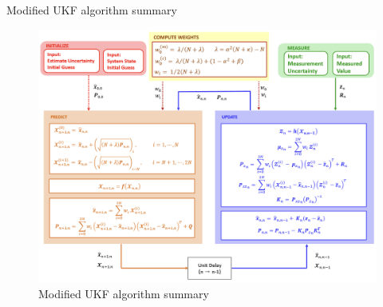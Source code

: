 \begin{frame}{Modified UKF algorithm summary}
  \begin{figure}
      \centering
      \includegraphics[width=0.85\linewidth]{Figures//Part3/Modified UKF Algorithm Summary.png}
      \caption{Modified UKF algorithm summary}
  \end{figure}
\end{frame}


